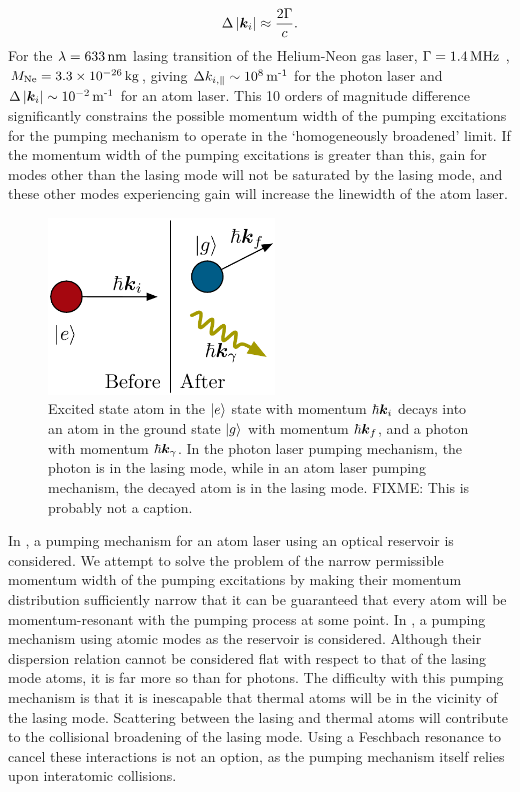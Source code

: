 \begin{align*}
    \Delta \left|\bm{k}_{i}\right| \approx \frac{2 \Gamma}{c}.
\end{align*}
For the $\lambda = \unit[633]{nm}$ lasing transition of the Helium-Neon gas laser, $\Gamma = \unit[1.4]{MHz}$ \citep[Table~13.2-1]{SalehTeich}, $M_\text{Ne} = 3.3 \times \unit[10^{-26}]{kg}$, giving $\Delta k_{i, \parallel} \sim \unit[10^8]{m\textsuperscript{-1}}$ for the photon laser and $\Delta\abs{\vect{k}_i} \sim \unit[10^{-2}]{m\textsuperscript{-1}}$ for an atom laser.  This 10 orders of magnitude difference significantly constrains the possible momentum width of the pumping excitations for the pumping mechanism to operate in the `homogeneously broadened' limit.  If the momentum width of the pumping excitations is greater than this, gain for modes other than the lasing mode will not be saturated by the lasing mode, and these other modes experiencing gain will increase the linewidth of the atom laser.  

\begin{figure}
    \centering
    \includegraphics[width=6cm]{AtomDecay}
    \caption{
        \label{Introduction:AtomDecay}
        Excited state atom in the ${\left|e\right>}$ state with momentum $\hbar \bm{k}_i$ decays into an atom in the ground state ${\left|g\right>}$ with momentum $\hbar \bm{k}_f$, and a photon with momentum $\hbar \bm{k}_\gamma$.  In the photon laser pumping mechanism, the photon is in the lasing mode, while in an atom laser pumping mechanism, the decayed atom is in the lasing mode.  FIXME: This is probably not a caption.
    }
\end{figure}

In , a pumping mechanism for an atom laser using an optical reservoir is considered.  We attempt to solve the problem of the narrow permissible momentum width of the pumping excitations by making their momentum distribution sufficiently narrow that it can be guaranteed that every atom will be momentum-resonant with the pumping process at some point.  In , a pumping mechanism using atomic modes as the reservoir is considered.  Although their dispersion relation cannot be considered flat with respect to that of the lasing mode atoms, it is far more so than for photons.  The difficulty with this pumping mechanism is that it is inescapable that thermal atoms will be in the vicinity of the lasing mode.  Scattering between the lasing and thermal atoms will contribute to the collisional broadening of the lasing mode.  Using a Feschbach resonance to cancel these interactions is not an option, as the pumping mechanism itself relies upon interatomic collisions.

